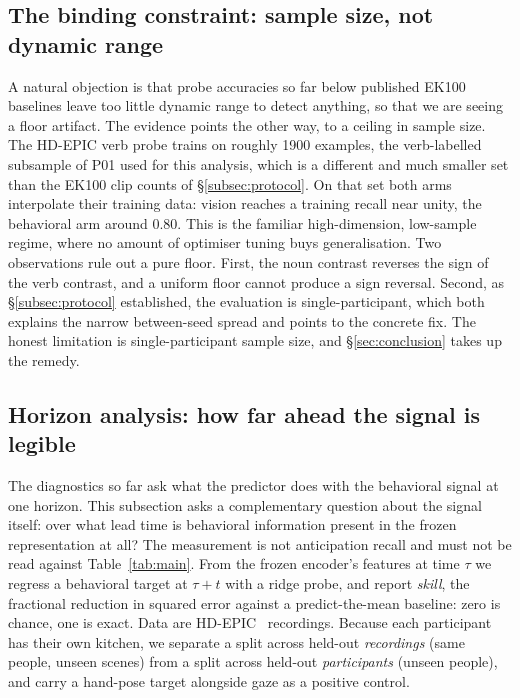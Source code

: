 \subsection{The binding constraint: sample size, not dynamic range}
\label{subsec:ddn}

A natural objection is that probe accuracies so far below published EK100
baselines leave too little dynamic range to detect anything, so that we are
seeing a floor artifact. The evidence points the other way, to a ceiling in
sample size. The HD-EPIC verb probe trains on roughly \num{1900} examples, the
verb-labelled subsample of P01 used for this analysis, which is a different and
much smaller set than the EK100 clip counts of \S\ref{subsec:protocol}. On that
set both arms interpolate their training data: vision reaches a training recall
near unity, the behavioral arm around $0.80$. This is the familiar
high-dimension, low-sample regime, where no amount of optimiser tuning buys
generalisation. Two observations rule out a pure floor. First, the noun contrast
reverses the sign of the verb contrast, and a uniform floor cannot produce a sign
reversal. Second, as \S\ref{subsec:protocol} established, the evaluation is
single-participant, which both explains the narrow between-seed spread and points
to the concrete fix. The honest limitation is single-participant sample size, and
\S\ref{sec:conclusion} takes up the remedy.

\subsection{Horizon analysis: how far ahead the signal is legible}
\label{subsec:horizon}

The diagnostics so far ask what the predictor does with the behavioral signal at
one horizon. This subsection asks a complementary question about the signal
itself: over what lead time is behavioral information present in the frozen
representation at all? The measurement is not anticipation recall and must not be
read against Table~\ref{tab:main}. From the frozen encoder's features at time
$\tau$ we regress a behavioral target at $\tau + t$ with a ridge probe, and report
\emph{skill}, the fractional reduction in squared error against a
predict-the-mean baseline: zero is chance, one is exact. Data are
HD-EPIC~\citep{perrett2025hdepic} recordings. Because each participant has their
own kitchen, we separate a split across held-out \emph{recordings} (same people,
unseen scenes) from a split across held-out \emph{participants} (unseen people),
and carry a hand-pose target alongside gaze as a positive control.

